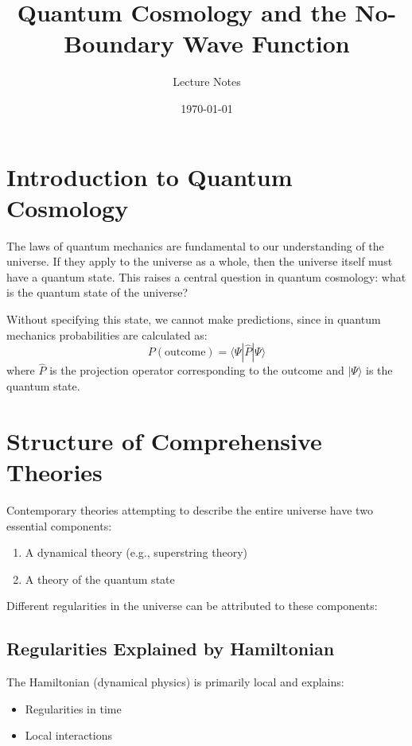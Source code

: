 \documentclass[12pt,a4paper]{article}
\title{Quantum Cosmology and the No-Boundary Wave Function}
\author{Lecture Notes}
\date{\today}
\begin{document}
\maketitle

\section{Introduction to Quantum Cosmology}

The laws of quantum mechanics are fundamental to our understanding of the universe. If they apply to the universe as a whole, then the universe itself must have a quantum state. This raises a central question in quantum cosmology: what is the quantum state of the universe?

Without specifying this state, we cannot make predictions, since in quantum mechanics probabilities are calculated as:
\begin{equation}
P(\text{outcome}) = \langle \Psi | \hat{P} | \Psi \rangle
\end{equation}
where $\hat{P}$ is the projection operator corresponding to the outcome and $|\Psi\rangle$ is the quantum state.

\section{Structure of Comprehensive Theories}

Contemporary theories attempting to describe the entire universe have two essential components:
\begin{enumerate}
    \item A dynamical theory (e.g., superstring theory)
    \item A theory of the quantum state
\end{enumerate}

Different regularities in the universe can be attributed to these components:

\subsection{Regularities Explained by Hamiltonian}
The Hamiltonian (dynamical physics) is primarily local and explains:
\begin{itemize}
    \item Regularities in time
    \item Local interactions
\end{itemize}
\end{document}
